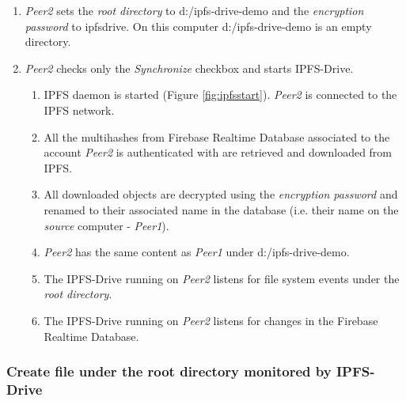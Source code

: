 \documentclass[12pt]{report}
\begin{document}
\begin{enumerate}[resume]

\item \textit{Peer2} sets the \textit{root directory} to {\ttfamily d:/ipfs-drive-demo} and the \textit{encryption password} to {\ttfamily ipfsdrive}. On this computer {\ttfamily d:/ipfs-drive-demo} is an empty directory.

\item \textit{Peer2} checks only the \textit{Synchronize} checkbox and starts IPFS-Drive.

	\begin{enumerate}

	\item IPFS daemon is started (Figure \ref{fig:ipfsstart}). \textit{Peer2} is connected to the IPFS network.

	\item All the multihashes from Firebase Realtime Database associated to the account \textit{Peer2} is authenticated with are retrieved and downloaded from IPFS.

	\item All downloaded objects are decrypted using the \textit{encryption password} and renamed to their associated name in the database (i.e. their name on the \textit{source} computer - \textit{Peer1}). 

	\item \textit{Peer2} has the same content as \textit{Peer1} under {\ttfamily d:/ipfs-drive-demo}.

	\item The IPFS-Drive running on \textit{Peer2} listens for file system events under the \textit{root directory}.

	\item The IPFS-Drive running on \textit{Peer2} listens for changes in the Firebase Realtime Database.

	\end{enumerate}

\end{enumerate}

\subsubsection{Create file under the root directory monitored by IPFS-Drive}
\end{document}
